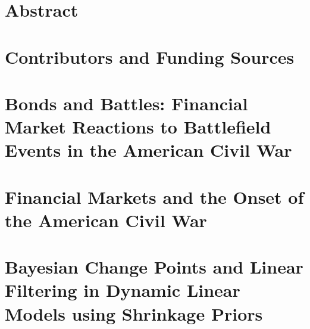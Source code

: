 \documentclass[12pt,oneside]{book}\usepackage[]{graphicx}\usepackage[]{color}
\begin{document}
% 


\chapter*{Abstract}



\chapter*{Contributors and Funding Sources}


\tableofcontents

\listoftables
{}

\listoffigures
{}





\clearpage
\setcounter{page}{0}


\chapter{Bonds and Battles: Financial Market Reactions to Battlefield Events in the American Civil War}
\label{cha:bonds-battles}



\chapter{Financial Markets and the Onset of the American Civil War}
\label{cha:financ-mark-onset}



\chapter{Bayesian Change Points and Linear Filtering in Dynamic Linear Models using Shrinkage Priors}
\label{cha:structural-breaks}



\clearpage
{}
\singlespacing

\printbibliography{}
\end{document}
